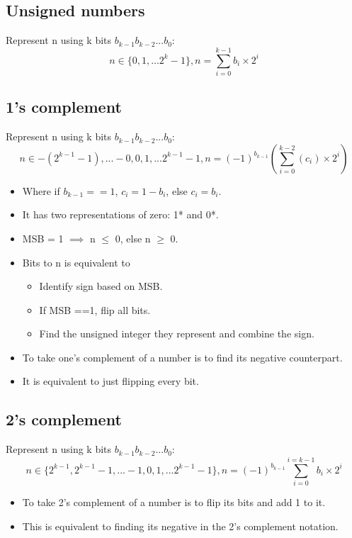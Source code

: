 \documentclass{report}
\begin{document}
\subsection{Unsigned numbers}
Represent n using k bits $b_{k-1}b_{k-2}...b_0$:
\begin{equation}
n \in \{0,1,...2^{k}-1\}, n = \sum_{i=0}^{k-1}b_i\times2^{i}
\end{equation}
\subsection{1's complement}
Represent n using k bits $b_{k-1}b_{k-2}...b_0$:
\begin{equation}
n \in {-(2^{k-1}-1),...-0,0,1,...2^{k-1}-1}, n = (-1)^{b_{k-1}}(\sum_{i=0}^{k-2} (c_i) \times 2^{i})
\end{equation} 
\begin{itemize}
\item Where if $b_{k-1}==1$, $c_i=1-b_i$, else $c_i=b_i$.
\item It has two representations of zero: 1* and 0*.
\item MSB = 1 $\implies$ n $\leq$ 0, else n $\geq$ 0.
\item Bits to n is equivalent to 
\begin{itemize}
    \item Identify sign based on MSB.
    \item If MSB ==1, flip all bits.
    \item Find the unsigned integer they represent and combine the sign.
\end{itemize}
\item To take one's complement of a number is to find its negative counterpart.
\item It is equivalent to just flipping every bit.
\end{itemize}
\subsection{2's complement}
Represent n using k bits $b_{k-1}b_{k-2}...b_0$:
\begin{equation}
n \in \{2^{k-1}, 2^{k-1}-1, ... -1,0,1,...2^{k-1}-1\}, n = (-1)^{b_{k-1}}\sum_{i=0}^{i=k-1} b_i \times 2^i
\end{equation}
\begin{itemize}
\item To take 2's complement of a number is to flip its bits and add 1 to it.
\item This is equivalent to finding its negative in the 2's complement notation.
\end{itemize}
\end{document}
